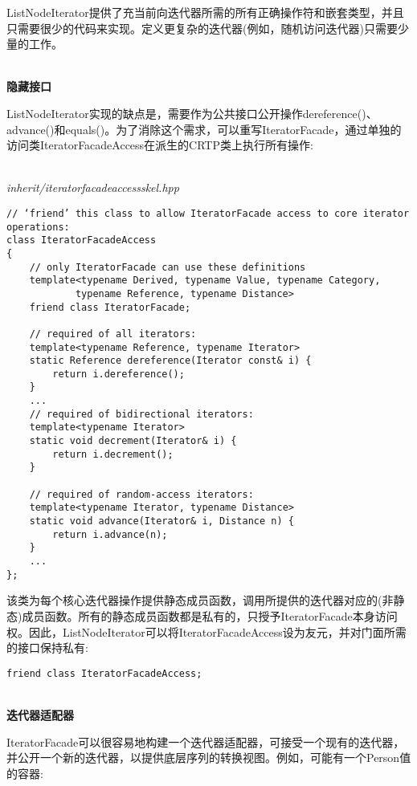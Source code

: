 ListNodeIterator提供了充当前向迭代器所需的所有正确操作符和嵌套类型，并且只需要很少的代码来实现。定义更复杂的迭代器(例如，随机访问迭代器)只需要少量的工作。

\hspace*{\fill} \\ %
\noindent
\textbf{隐藏接口}

ListNodeIterator实现的缺点是，需要作为公共接口公开操作dereference()、advance()和equals()。为了消除这个需求，可以重写IteratorFacade，通过单独的访问类IteratorFacadeAccess在派生的CRTP类上执行所有操作:

\hspace*{\fill} \\ %
\noindent
\textit{inherit/iteratorfacadeaccessskel.hpp}
\begin{lstlisting}[style=styleCXX]
// ‘friend’ this class to allow IteratorFacade access to core iterator operations:
class IteratorFacadeAccess
{
	// only IteratorFacade can use these definitions
	template<typename Derived, typename Value, typename Category,
			typename Reference, typename Distance>
	friend class IteratorFacade;
	
	// required of all iterators:
	template<typename Reference, typename Iterator>
	static Reference dereference(Iterator const& i) {
		return i.dereference();
	}
	...
	// required of bidirectional iterators:
	template<typename Iterator>
	static void decrement(Iterator& i) {
		return i.decrement();
	}

	// required of random-access iterators:
	template<typename Iterator, typename Distance>
	static void advance(Iterator& i, Distance n) {
		return i.advance(n);
	}
	...
};
\end{lstlisting}

该类为每个核心迭代器操作提供静态成员函数，调用所提供的迭代器对应的(非静态)成员函数。所有的静态成员函数都是私有的，只授予IteratorFacade本身访问权。因此，ListNodeIterator可以将IteratorFacadeAccess设为友元，并对门面所需的接口保持私有:

\begin{lstlisting}[style=styleCXX]
friend class IteratorFacadeAccess;
\end{lstlisting}

\hspace*{\fill} \\ %
\noindent
\textbf{迭代器适配器}

IteratorFacade可以很容易地构建一个迭代器适配器，可接受一个现有的迭代器，并公开一个新的迭代器，以提供底层序列的转换视图。例如，可能有一个Person值的容器:

